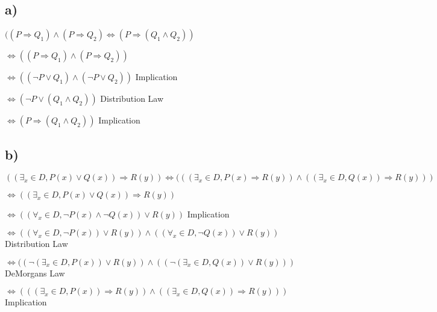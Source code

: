 \documentclass[11pt, oneside]{article}   	%
\begin{document}
\subsection{a)}
$((P \Rightarrow Q_1) \land (P \Rightarrow Q_2) \Leftrightarrow (P \Rightarrow (Q_1 \land Q_2))$

$\Leftrightarrow ((P \Rightarrow Q_1) \land (P \Rightarrow Q_2))$

$\Leftrightarrow ((\neg P \lor Q_1) \land (\neg P \lor Q_2))$ Implication 

$\Leftrightarrow (\neg P \lor (Q_1 \land Q_2))$ Distribution Law

$\Leftrightarrow (P \Rightarrow (Q_1 \land Q_2))$ Implication
\subsection{b)}
$ ((\exists_x \in D, P(x) \lor Q(x)) \Rightarrow R(y)) \Leftrightarrow (((\exists_x \in D, P(x) \Rightarrow R(y)) \land ((\exists_x \in D, Q(x)) \Rightarrow R(y)))$

$\Leftrightarrow ((\exists_x \in D, P(x) \lor Q(x)) \Rightarrow R(y))$

$\Leftrightarrow ((\forall_x \in D, \neg P(x) \land \neg Q(x)) \lor R(y))$ Implication

$\Leftrightarrow ((\forall_x \in D, \neg P(x)) \lor R(y)) \land ((\forall_x \in D, \neg Q(x)) \lor R(y))$ Distribution Law

$\Leftrightarrow ((\neg (\exists_x \in D, P(x)) \lor R(y)) \land ((\neg (\exists_x \in D, Q(x)) \lor R(y)))$ DeMorgans Law

$\Leftrightarrow (((\exists_x \in D, P(x)) \Rightarrow R(y)) \land ((\exists_x \in D, Q(x)) \Rightarrow R(y)))$ Implication
\end{document}
